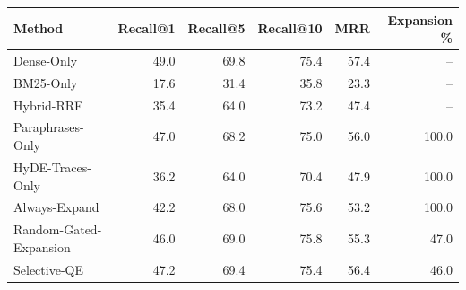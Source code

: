 \begin{tabular}{lrrrrr}
\toprule
Method & Recall@1 & Recall@5 & Recall@10 & MRR & Expansion \%
\\
\midrule
Dense-Only & 49.0 & 69.8 & 75.4 & 57.4 & -- \\
BM25-Only & 17.6 & 31.4 & 35.8 & 23.3 & -- \\
Hybrid-RRF & 35.4 & 64.0 & 73.2 & 47.4 & -- \\
Paraphrases-Only & 47.0 & 68.2 & 75.0 & 56.0 & 100.0 \\
HyDE-Traces-Only & 36.2 & 64.0 & 70.4 & 47.9 & 100.0 \\
Always-Expand & 42.2 & 68.0 & 75.6 & 53.2 & 100.0 \\
Random-Gated-Expansion & 46.0 & 69.0 & 75.8 & 55.3 & 47.0 \\
Selective-QE & 47.2 & 69.4 & 75.4 & 56.4 & 46.0 \\
\bottomrule
\end{tabular}
